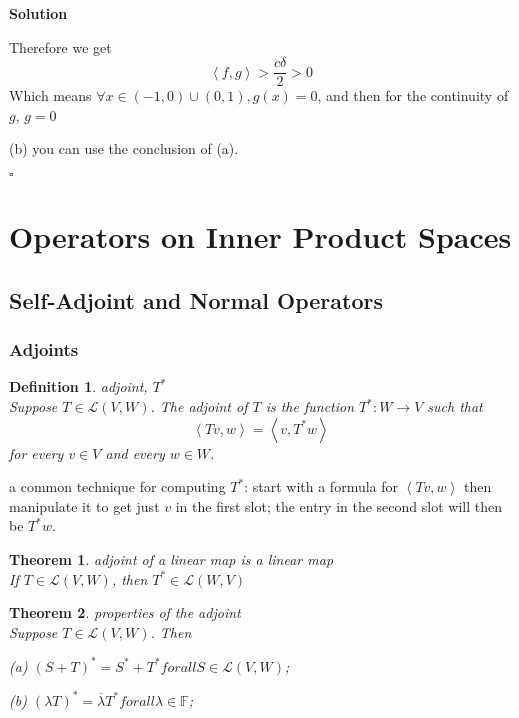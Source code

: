 \documentclass{article}
\newtheorem{theorem}{Theorem}[subsection]
\newtheorem{definition}{Definition}[subsection]
\newenvironment{solution}{%
{
    \textbf{Solution\\}
    }
}{
  \hfill $\square$ 
  \par\bigskip 
}
\newcommand{\FF}{\mathbb{F}}
\begin{document}
\begin{CJK}{UTF8}{gkai}
\begin{solution}
    Therefore we get \[\left<f,g\right> > \dfrac{c\delta}{2} > 0\]
    Which means $\forall x \in (-1,0)\cup (0,1), g(x) = 0$, and then for the continuity of $g$, $g = 0$

    (b) you can use the conclusion of (a).
\end{solution}
\section{Operators on Inner Product Spaces}

\subsection{Self-Adjoint and Normal Operators}

\subsubsection{Adjoints}

\begin{definition}
    adjoint, $T^\ast$\\

    Suppose $T \in \mathcal{L}(V,W)$. The adjoint of $T$ is the function $T^\ast: W \to V$ such that
    \[\left<Tv,w\right> = \left<v,T^\ast w\right>\]
    for every $v \in V$ and every $w \in W$.
\end{definition}

a common technique for computing $T^\ast$: start with a formula for $\left<Tv,w\right>$ then manipulate it to get just $v$ in the first slot; the entry in the second slot will then be $T^\ast w$.\\

\begin{theorem}
    adjoint of a linear map is a linear map\\

    If $T \in \mathcal{L}(V,W)$, then $T^\ast \in \mathcal{L}(W,V)$
\end{theorem}

\begin{theorem}
    properties of the adjoint\\

    Suppose $T \in \mathcal{L}(V,W)$. Then

    (a) $(S +T)^\ast = S^\ast +T^\ast for all S \in \mathcal{L}(V,W)$;

    (b) $(\lambda T)^\ast = \overline{\lambda} T^\ast for all \lambda  \in \FF$;


\end{theorem}
\end{CJK}
\end{document}
